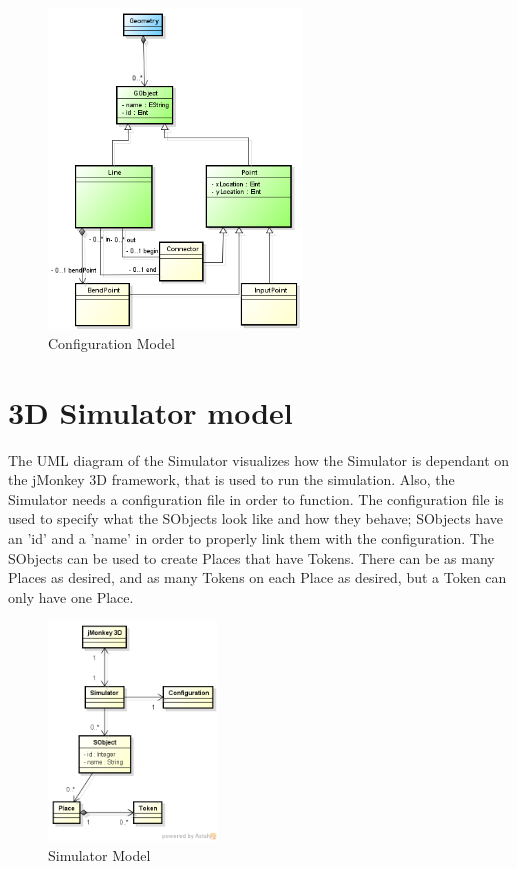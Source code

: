 \documentclass[11pt]{article}   %
\begin{document}
\begin{figure}[htp]
\begin{center}
  \includegraphics[width=0.6\textwidth]{image/geometry_model.png}
  \caption{Configuration Model}
  \label{fig:configuration_model}
\end{center}
\end{figure}

\newpage
\section{3D Simulator model}

The UML diagram of the Simulator visualizes how the Simulator is dependant on the jMonkey 3D framework, that is used to run the simulation. Also, the Simulator needs a configuration file in order to function. The configuration file is used to specify what the SObjects look like and how they behave; SObjects have an 'id' and a 'name' in order to properly link them with the configuration. The SObjects can be used to create Places that have Tokens. There can be as many Places as desired, and as many Tokens on each Place as desired, but a Token can only have one Place.

\begin{figure}[htp]
\begin{center}
  \includegraphics[width=0.4\textwidth]{image/simulator_model.png}
  \caption{Simulator Model}
  \label{fig:simulator_model}
\end{center}
\end{figure}

\printindex
\end{document}
